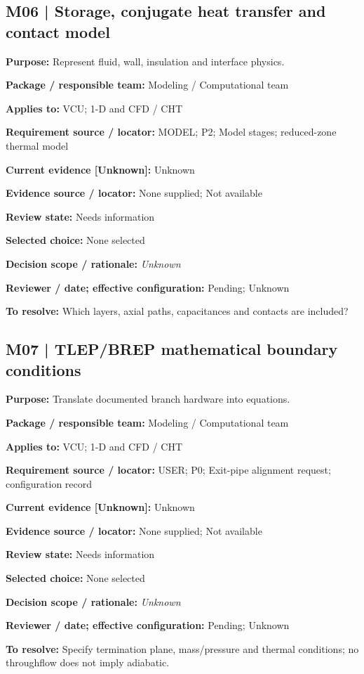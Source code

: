 \documentclass[11pt]{article}
\begin{document}
\begin{minipage}{\textwidth}\small\setlength{\parskip}{2pt}
\subsection*{M06 | Storage, conjugate heat transfer and contact model}
\textbf{Purpose:} Represent fluid, wall, insulation and interface physics.\par
\textbf{Package / responsible team:} Modeling / Computational team\par
\textbf{Applies to:} VCU; 1-D and CFD / CHT\par
\textbf{Requirement source / locator:} MODEL; P2; Model stages; reduced-zone thermal model\par
\textbf{Current evidence [Unknown]:} Unknown\par
\textbf{Evidence source / locator:} None supplied; Not available\par
\textbf{Review state:} Needs information\par
\textbf{Selected choice:} None selected\par
\textbf{Decision scope / rationale:} \textit{Unknown}\par
\textbf{Reviewer / date; effective configuration:} Pending; Unknown\par
\textbf{To resolve:} Which layers, axial paths, capacitances and contacts are included?\par
\end{minipage}\par\vspace{5pt}
\begin{minipage}{\textwidth}\small\setlength{\parskip}{2pt}
\subsection*{M07 | TLEP/BREP mathematical boundary conditions}
\textbf{Purpose:} Translate documented branch hardware into equations.\par
\textbf{Package / responsible team:} Modeling / Computational team\par
\textbf{Applies to:} VCU; 1-D and CFD / CHT\par
\textbf{Requirement source / locator:} USER; P0; Exit-pipe alignment request; configuration record\par
\textbf{Current evidence [Unknown]:} Unknown\par
\textbf{Evidence source / locator:} None supplied; Not available\par
\textbf{Review state:} Needs information\par
\textbf{Selected choice:} None selected\par
\textbf{Decision scope / rationale:} \textit{Unknown}\par
\textbf{Reviewer / date; effective configuration:} Pending; Unknown\par
\textbf{To resolve:} Specify termination plane, mass/pressure and thermal conditions; no throughflow does not imply adiabatic.\par
\end{minipage}\par\vspace{5pt}
\end{document}
